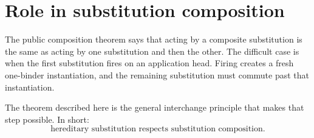 \documentclass[11pt]{article}
\begin{document}
\section*{Role in substitution composition}

The public composition theorem says that acting by a composite substitution is
the same as acting by one substitution and then the other.  The difficult case
is when the first substitution fires on an application head.  Firing creates a
fresh one-binder instantiation, and the remaining substitution must commute
past that instantiation.

The theorem described here is the general interchange principle that makes that
step possible.  In short:
\[
  \text{hereditary substitution respects substitution composition.}
\]
\end{document}
